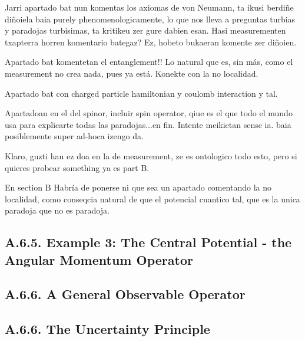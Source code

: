 \documentclass[11pt, a4paper]{article} %
\begin{document}
Jarri apartado bat nun komentas los axiomas de von Neumann, ta ikusi berdiñe diñoiela baia purely phenomenologicamente, lo que nos lleva a preguntas turbias y paradojas turbisimas, ta kritikeu zer gure dabien esan. Hasi measurementen txapterra horren komentario bategaz? Ez, hobeto bukaeran komente zer diñoien.

Apartado bat komentetan el entanglement!! Lo natural que es, sin más, como el measurement no crea nada, pues ya está. Konekte con la no localidad.

Apartado bat con charged particle hamiltonian y coulomb interaction y tal.

Apartadoan en el del spinor, incluir spin operator, qiue es el que todo el mundo usa para explicarte todas las paradojas...en fin. Intente meikietan sense ia. baia posiblemente super ad-hoca izengo da.

Klaro, guzti hau ez doa en la de measurement, ze es ontologico todo esto, pero si quieres probear something ya es part B.

En section B Habría de ponerse ni que sea un apartado comentando la no localidad, como conseqcia natural de que el potencial cuantico tal, que es la unica paradoja que no es paradoja.







\subsection*{A.6.5. Example 3: The Central Potential - the Angular Momentum Operator}


\subsection*{A.6.6. A General Observable Operator}

\subsection*{A.6.6. The Uncertainty Principle}
\end{document}
